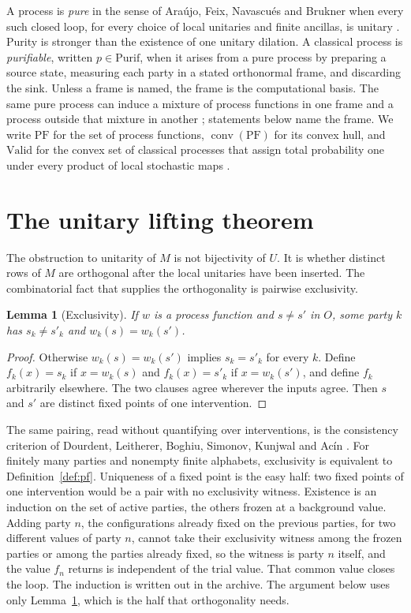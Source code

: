 \documentclass[11pt]{article}
\newtheorem{lemma}[theorem]{Lemma}
\theoremstyle{definition}
\theoremstyle{remark}
\newcommand{\conv}{\operatorname{conv}}
\newcommand{\PF}{\mathrm{PF}}
\newcommand{\Purif}{\mathrm{Purif}}
\newcommand{\Valid}{\mathrm{Valid}}
\begin{document}
A process is \emph{pure} in the sense of Ara\'ujo, Feix, Navascu\'es and Brukner when every such closed loop, for every choice of local unitaries and finite ancillas, is unitary \cite{araujo2017}. Purity is stronger than the existence of one unitary dilation. A classical process is \emph{purifiable}, written \(p\in\Purif\), when it arises from a pure process by preparing a source state, measuring each party in a stated orthonormal frame, and discarding the sink. Unless a frame is named, the frame is the computational basis. The same pure process can induce a mixture of process functions in one frame and a process outside that mixture in another \cite{archive}; statements below name the frame. We write \(\PF\) for the set of process functions, \(\conv(\PF)\) for its convex hull, and \(\Valid\) for the convex set of classical processes that assign total probability one under every product of local stochastic maps \cite{baumeler2016}.

\section{The unitary lifting theorem}
\label{sec:lift}

The obstruction to unitarity of \(M\) is not bijectivity of \(U\). It is whether distinct rows of \(M\) are orthogonal after the local unitaries have been inserted. The combinatorial fact that supplies the orthogonality is pairwise exclusivity.

\begin{lemma}[Exclusivity]
\label{lem:ex}
If \(w\) is a process function and \(s\neq s'\) in \(O\), some party \(k\) has \(s_k\neq s'_k\) and \(w_k(s)=w_k(s')\).
\end{lemma}

\begin{proof}
Otherwise \(w_k(s)=w_k(s')\) implies \(s_k=s'_k\) for every \(k\). Define \(f_k(x)=s_k\) if \(x=w_k(s)\) and \(f_k(x)=s'_k\) if \(x=w_k(s')\), and define \(f_k\) arbitrarily elsewhere. The two clauses agree wherever the inputs agree. Then \(s\) and \(s'\) are distinct fixed points of one intervention.
\end{proof}

The same pairing, read without quantifying over interventions, is the consistency criterion of Dourdent, Leitherer, Boghiu, Simonov, Kunjwal and Ac\'in \cite{dourdent2026}. For finitely many parties and nonempty finite alphabets, exclusivity is equivalent to Definition~\ref{def:pf}. Uniqueness of a fixed point is the easy half: two fixed points of one intervention would be a pair with no exclusivity witness. Existence is an induction on the set of active parties, the others frozen at a background value. Adding party \(n\), the configurations already fixed on the previous parties, for two different values of party \(n\), cannot take their exclusivity witness among the frozen parties or among the parties already fixed, so the witness is party \(n\) itself, and the value \(f_n\) returns is independent of the trial value. That common value closes the loop. The induction is written out in the archive. The argument below uses only Lemma~\ref{lem:ex}, which is the half that orthogonality needs.
\end{document}
